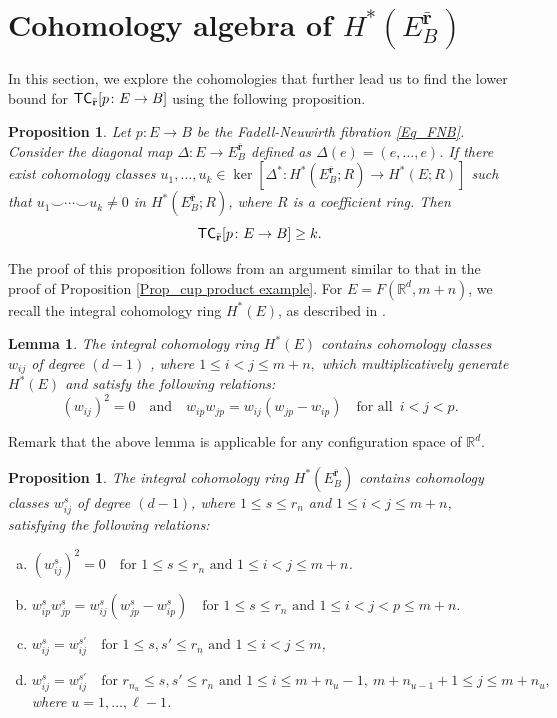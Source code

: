 \documentclass[12pt,oneside,reqno]{amsart}
\theoremstyle{plain}
\newtheorem{proposition}[theorem]{Proposition}
\newtheorem{lemma}[theorem]{Lemma}
\theoremstyle{definition}
\theoremstyle{remark}
\newcommand{\sect}{\setcounter{figure}{0}\section}
\newcommand{\TC}{{\sf {TC}}}
\newcommand{\rr}{{\mathbb {R}}}
\newcommand{\br}{\bar{\mathbf{r}}}
\begin{document}
\sect{Cohomology algebra of $H^{*}(E^{\br}_B)$}
\label{sec:cohomology}

In this section, we explore the cohomologies that further lead us to find the lower bound for $\TC_{\br}[p\colon E \to B]$ using the following proposition.

\begin{proposition}\label{Prop_lbptc}
Let $p\colon E \to B$ be the Fadell-Neuwirth fibration \eqref{Eq_FNB}. Consider the diagonal map $\Delta \colon E\to E^{\bar{\textbf{r}}}_B$ defined as $\Delta(e) = (e, \dots, e)$. If there exist cohomology classes $u_1, \dots, u_k\in \ker[\Delta^{\ast}\colon H^{\ast}(E^{\bar{\textbf{r}}}_B; R)\to H^{\ast}(E; R)]$ such that $u_1 \smile \cdots \smile u_k \neq 0$ in $H^{\ast}(E^{\bar{\textbf{r}}}_B; R)$, where $R$ is a coefficient ring. Then $$\TC_{\bar{\textbf{r}}}[p\colon E \to B] \geq k.$$
\end{proposition}

The proof of this proposition follows from an argument similar to that in the proof of Proposition \ref{Prop_cup product example}.
For $E = F(\rr^d, m+n)$, we recall the integral cohomology ring $H^\ast(E)$, as described in \cite[Chapter V, Theorem 4.2 and 4.3]{FadH01}.
\begin{lemma}\label{Lem_cohomology ring of E}
The integral cohomology ring $H^\ast(E)$ contains cohomology classes $w_{ij}$ of degree $(d-1)$ , where $1\leq i< j\leq m+n,$ which multiplicatively generate $H^*(E)$ and satisfy the following relations: $$(w_{ij})^2=0 \quad \mbox{and}\quad w_{ip}w_{jp}= w_{ij}(w_{jp}-w_{ip})\quad \text{for all }\,  i<j<p.$$
\end{lemma}

Remark that the above lemma is applicable for any configuration space of $\rr^d$.

\begin{proposition}\label{Prop_relations on cohomology classes}
The integral cohomology ring $H^*(E_B^{\br})$ contains cohomology classes $w^s_{ij}$ of degree $(d-1)$, where $1\leq s \leq r_n$ and $1\leq i < j \leq m+n$, satisfying the following relations: 
\begin{enumerate}[(a)]
\item $(w_{ij}^s)^2=0 \quad \text{for } 1\leq s \leq r_n \text{ and } 1\leq i < j \leq m+n$.
\item $w_{ip}^s w_{jp}^s= w_{ij}^s(w_{jp}^s-w_{ip}^s) \quad \text{for } 1\leq s \leq r_n \text{ and } 1\leq i < j <p \leq m+n.$    
\item $w_{ij}^s = w_{ij}^{s'} \quad \text{for } 1\leq s, s' \leq r_n \text{ and } 1\leq i < j \leq m$,
\item $w^s_{ij} = w^{s'}_{ij} \quad \text{for }  r_{n_u}\leq s, s'\leq r_n \text{ and } 1\leq i \leq m + n_{u}-1, ~ m+n_{u-1} +1\leq j \leq m + n_u,$ where $u= 1, \ldots, \ell-1$.
\end{enumerate}
\end{proposition}
\end{document}
